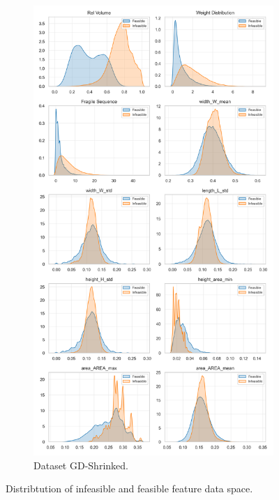 \begin{figure}[!ht]
\begin{subfigure}[t]{0.49\textwidth}
		\centering
		\caption{Dataset GD-Shrinked.}
		\includegraphics[width=\textwidth]{pictures/dataset_structure/Distribution_CPStatus_RouteDataset.png}
	\end{subfigure}
	\caption{Distribtution of infeasible and feasible feature data space.}
	\label{Feature space comparison for feasible and infeasible training data points.}
\end{figure}


